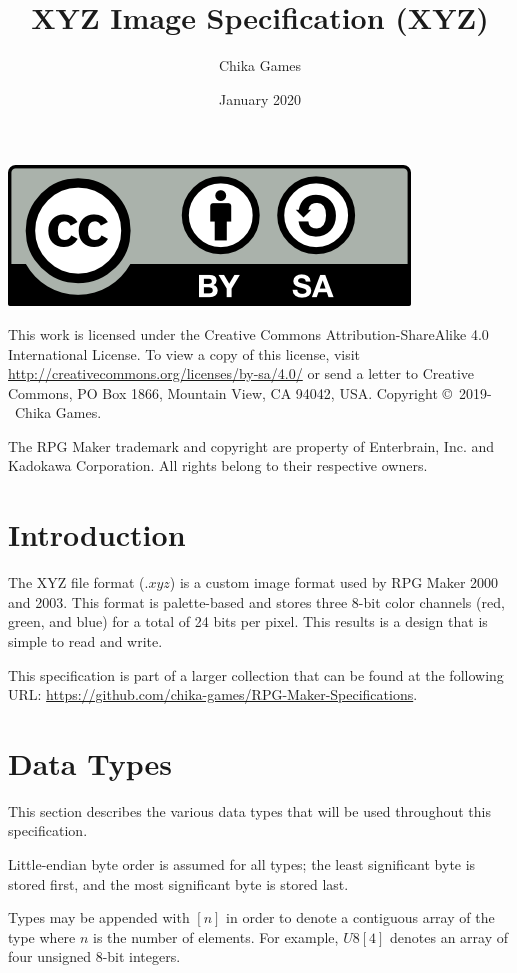 \documentclass{article}
\title{XYZ Image Specification (XYZ)}
\author{Chika Games}
\date{January 2020}
\begin{document}
\maketitle
\tableofcontents

\newpage

\includegraphics[scale=0.75]{by-sa}

This work is licensed under the Creative Commons Attribution-ShareAlike 4.0 International License. To view a copy of this license, visit \url{http://creativecommons.org/licenses/by-sa/4.0/} or send a letter to Creative Commons, PO Box 1866, Mountain View, CA 94042, USA. Copyright \copyright~2019-\the\year~Chika Games.

The RPG Maker trademark and copyright are property of Enterbrain, Inc. and Kadokawa Corporation. All rights belong to their respective owners.

\newpage

\section{Introduction}
The XYZ file format ($.xyz$) is a custom image format used by RPG Maker 2000 and 2003. This format is palette-based and stores three 8-bit color channels (red, green, and blue) for a total of 24 bits per pixel. This results is a design that is simple to read and write.

This specification is part of a larger collection that can be found at the following URL: \url{https://github.com/chika-games/RPG-Maker-Specifications}.

\section{Data Types}
This section describes the various data types that will be used throughout this specification.

Little-endian byte order is assumed for all types; the least significant byte is stored first, and the most significant byte is stored last.

Types may be appended with $[n]$ in order to denote a contiguous array of the type where $n$ is the number of elements. For example, $U8[4]$ denotes an array of four unsigned 8-bit integers.
\end{document}

